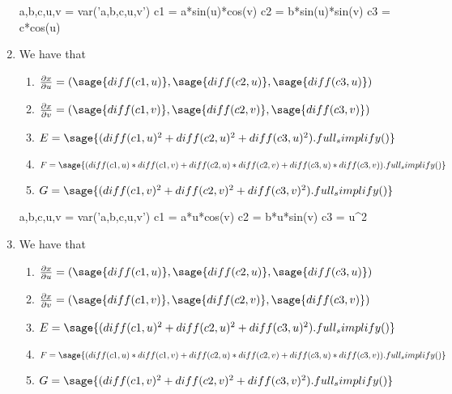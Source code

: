 \documentclass[12pt]{article}
\begin{document}
\begin{enumerate}
    \begin{sagesilent}
        a,b,c,u,v = var('a,b,c,u,v')
        c1 = a*sin(u)*cos(v)
        c2 = b*sin(u)*sin(v)
        c3 = c*cos(u)
    \end{sagesilent}
    \item We have that 
    \begin{enumerate}
    \item $\frac{ \partial x}{\partial u} = (\sage{diff(c1,u)}, \sage{diff(c2, u)}, \sage{diff(c3,u)})$ 
    \item $\frac{ \partial x}{\partial v} = (\sage{diff(c1,v)}, \sage{diff(c2, v)}, \sage{diff(c3,v)})$
    \item $E = \sage{(diff(c1,u)^2 + diff(c2,u)^2 + diff(c3,u)^2).full_simplify()}$
    \item $F = \sage{(diff(c1,u)*diff(c1,v) + diff(c2,u)*diff(c2,v) + diff(c3,u)*diff(c3,v)).full_simplify()}$ 
    \item $G = \sage{(diff(c1,v)^2 + diff(c2,v)^2 + diff(c3,v)^2).full_simplify()}$
    \end{enumerate}

    \begin{sagesilent}
        a,b,c,u,v = var('a,b,c,u,v')
        c1 = a*u*cos(v)
        c2 = b*u*sin(v)
        c3 = u^2
    \end{sagesilent}
    \item We have that 
    \begin{enumerate}
    \item $\frac{ \partial x}{\partial u} = (\sage{diff(c1,u)}, \sage{diff(c2, u)}, \sage{diff(c3,u)})$ 
    \item $\frac{ \partial x}{\partial v} = (\sage{diff(c1,v)}, \sage{diff(c2, v)}, \sage{diff(c3,v)})$
    \item $E = \sage{(diff(c1,u)^2 + diff(c2,u)^2 + diff(c3,u)^2).full_simplify()}$
    \item $F = \sage{(diff(c1,u)*diff(c1,v) + diff(c2,u)*diff(c2,v) + diff(c3,u)*diff(c3,v)).full_simplify()}$ 
    \item $G = \sage{(diff(c1,v)^2 + diff(c2,v)^2 + diff(c3,v)^2).full_simplify()}$
    \end{enumerate}


\end{enumerate}
\end{document}
